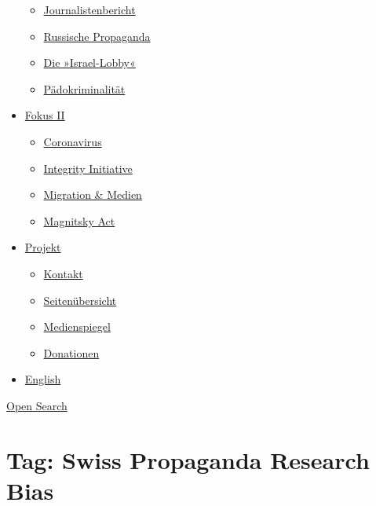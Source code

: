 \begin{itemize}
  \begin{itemize}
  \tightlist
  \item
    \href{https://swprs.org/bericht-eines-journalisten/}{Journalistenbericht}
  \item
    \href{https://swprs.org/russische-propaganda/}{Russische Propaganda}
  \item
    \href{https://swprs.org/die-israel-lobby-fakten-und-mythen/}{Die
    »Israel-Lobby«}
  \item
    \href{https://swprs.org/geopolitik-und-paedokriminalitaet/}{Pädokriminalität}
  \end{itemize}
\item
  \href{https://swprs.org/migration-und-medien/}{Fokus II}

  \begin{itemize}
  \tightlist
  \item
    \href{https://swprs.org/covid-19-hinweis-ii/}{Coronavirus}
  \item
    \href{https://swprs.org/die-integrity-initiative/}{Integrity
    Initiative}
  \item
    \href{https://swprs.org/migration-und-medien/}{Migration \& Medien}
  \item
    \href{https://swprs.org/der-fall-magnitsky/}{Magnitsky Act}
  \end{itemize}
\item
  \href{https://swprs.org/kontakt/}{Projekt}

  \begin{itemize}
  \tightlist
  \item
    \href{https://swprs.org/kontakt/}{Kontakt}
  \item
    \href{https://swprs.org/uebersicht/}{Seitenübersicht}
  \item
    \href{https://swprs.org/medienspiegel/}{Medienspiegel}
  \item
    \href{https://swprs.org/donationen/}{Donationen}
  \end{itemize}
\item
  \href{https://swprs.org/contact/}{English}
\end{itemize}

\protect\hyperlink{}{Open Search}

\hypertarget{tag-swiss-propaganda-research-bias}{%
\section{Tag: Swiss Propaganda Research
Bias}\label{tag-swiss-propaganda-research-bias}}

